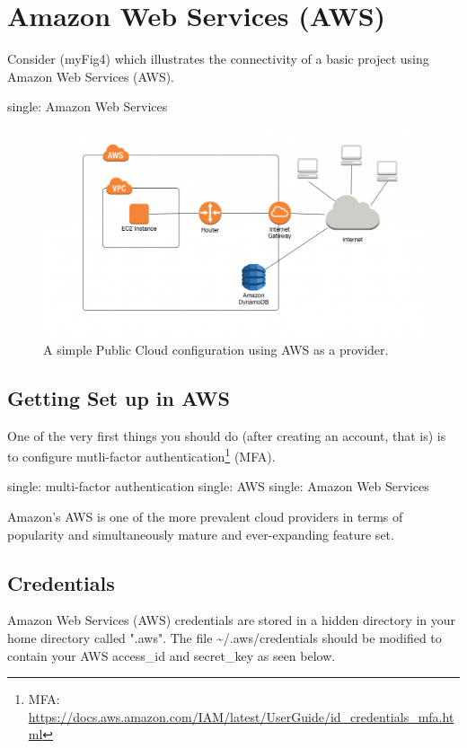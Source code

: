 \section{Amazon Web Services (AWS)}

\justify
Consider ({myFig4}) which illustrates the connectivity of a basic
project using Amazon Web Services (AWS).

single: Amazon Web Services

\begin{figure}
  \includegraphics[scale=0.45]{../images/ddb-no-vpc-endpoint-1024x561.png}
  \caption{A simple Public Cloud configuration using AWS as a provider.}
\end{figure}

\subsection{Getting Set up in AWS}

\justify
One of the very first things you should do (after creating an account,
that is) is to configure mutli-factor authentication\footnote{MFA:
  \url{https://docs.aws.amazon.com/IAM/latest/UserGuide/id_credentials_mfa.html}}
(MFA).

single: multi-factor authentication
single: AWS single: Amazon Web Services

\justify
Amazon's AWS is one of the more prevalent cloud providers in terms of
popularity and simultaneously mature and ever-expanding feature set.

\subsection{Credentials}

\justify
Amazon Web Services (AWS) credentials are stored in a hidden directory
in your home directory called ".aws". The file
\textasciitilde{}/.aws/credentials should be modified to contain your
AWS access\_id and secret\_key as seen below.

